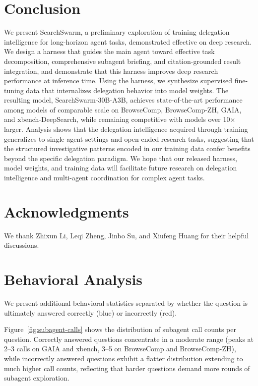 \documentclass{llmxive}
\begin{document}
\section{Conclusion}
\label{sec:conclusion}

We present SearchSwarm, a preliminary exploration of training delegation intelligence for long-horizon agent tasks, demonstrated effective on deep research. We design a harness that guides the main agent toward effective task decomposition, comprehensive subagent briefing, and citation-grounded result integration, and demonstrate that this harness improves deep research performance at inference time. Using the harness, we synthesize supervised fine-tuning data that internalizes delegation behavior into model weights. The resulting model, SearchSwarm-30B-A3B, achieves state-of-the-art performance among models of comparable scale on BrowseComp, BrowseComp-ZH, GAIA, and xbench-DeepSearch, while remaining competitive with models over 10$\times$ larger. Analysis shows that the delegation intelligence acquired through training generalizes to single-agent settings and open-ended research tasks, suggesting that the structured investigative patterns encoded in our training data confer benefits beyond the specific delegation paradigm. We hope that our released harness, model weights, and training data will facilitate future research on delegation intelligence and multi-agent coordination for complex agent tasks.

\section*{Acknowledgments}
We thank Zhixun Li, Leqi Zheng, Jinbo Su, and Xiufeng Huang for their helpful discussions.






\appendix
\section{Behavioral Analysis}
\label{sec:appendix-behavior}

We present additional behavioral statistics separated by whether the question is ultimately answered correctly (blue) or incorrectly (red).

Figure~\ref{fig:subagent-calls} shows the distribution of subagent call counts per question. Correctly answered questions concentrate in a moderate range (peaks at 2--3 calls on GAIA and xbench, 3--5 on BrowseComp and BrowseComp-ZH), while incorrectly answered questions exhibit a flatter distribution extending to much higher call counts, reflecting that harder questions demand more rounds of subagent exploration.
\end{document}
